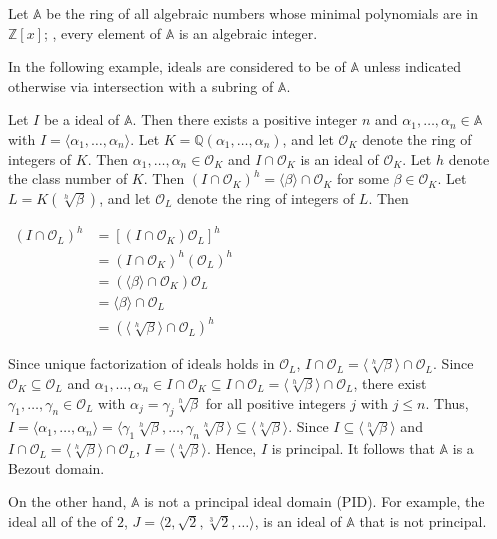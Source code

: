 \documentclass[12pt]{article}
\begin{document}
Let $\mathbb{A}$ be the ring of all algebraic numbers whose minimal polynomials are in $\mathbb{Z}[x]$; , every element of $\mathbb{A}$ is an algebraic integer.

In the following example, ideals are considered to be of $\mathbb{A}$ unless indicated otherwise via intersection with a subring of $\mathbb{A}$.

Let $I$ be a  ideal of $\mathbb{A}$.  Then there exists a positive integer $n$ and $\alpha_1, \dots , \alpha_n \in \mathbb{A}$ with $I=\langle \alpha_1, \dots , \alpha_n \rangle$.  Let $K=\mathbb{Q}(\alpha_1, \dots , \alpha_n)$, and let $\mathcal{O}_K$ denote the ring of integers of $K$.  Then $\alpha_1, \dots , \alpha_n \in \mathcal{O}_K$ and $I \cap \mathcal{O}_K$ is an ideal of $\mathcal{O}_K$.  Let $h$ denote the class number of $K$.  Then $(I \cap \mathcal{O}_K)^h=\langle \beta \rangle \cap \mathcal{O}_K$ for some $\beta \in \mathcal{O}_K$.  Let $L=K(\sqrt[h]{\beta})$, and let $\mathcal{O}_L$ denote the ring of integers of $L$.  Then

\begin{center}
$\begin{array}{rl}
(I \cap \mathcal{O}_L)^h & = [(I \cap \mathcal{O}_K)\mathcal{O}_L]^h \\
& =(I \cap \mathcal{O}_K)^h(\mathcal{O}_L)^h \\
& =(\langle \beta \rangle \cap \mathcal{O}_K) \mathcal{O}_L \\
& =\langle \beta \rangle \cap \mathcal{O}_L \\
& =(\langle \sqrt[h]{\beta} \rangle \cap \mathcal{O}_L)^h \end{array}$
\end{center}

Since unique factorization of ideals holds in $\mathcal{O}_L$, $I \cap \mathcal{O}_L=\langle \sqrt[h]{\beta} \rangle \cap \mathcal{O}_L$.  Since $\mathcal{O}_K \subseteq \mathcal{O}_L$ and $\alpha_1, \dots , \alpha_n \in I \cap \mathcal{O}_K \subseteq I \cap \mathcal{O}_L=\langle \sqrt[h]{\beta} \rangle \cap \mathcal{O}_L$, there exist $\gamma_1, \dots , \gamma_n \in \mathcal{O}_L$ with $\alpha_j = \gamma_j \sqrt[h]{\beta}$ for all positive integers $j$ with $j \le n$.  Thus, $I=\langle \alpha_1, \dots , \alpha_n \rangle = \langle \gamma_1 \sqrt[h]{\beta}, \dots , \gamma_n \sqrt[h]{\beta} \rangle \subseteq \langle \sqrt[h]{\beta} \rangle$.  Since $I \subseteq \langle \sqrt[h]{\beta} \rangle$ and $I \cap \mathcal{O}_L =\langle \sqrt[h]{\beta} \rangle \cap \mathcal{O}_L$, $I=\langle \sqrt[h]{\beta} \rangle$.  Hence, $I$ is principal.  It follows that $\mathbb{A}$ is a Bezout domain.

On the other hand, $\mathbb{A}$ is not a principal ideal domain (PID).  For example, the ideal  all of the  of $2$, $J=\langle 2, \sqrt{2}, \sqrt[3]{2}, \dots \rangle$, is an ideal of $\mathbb{A}$ that is not principal.
\end{document}
